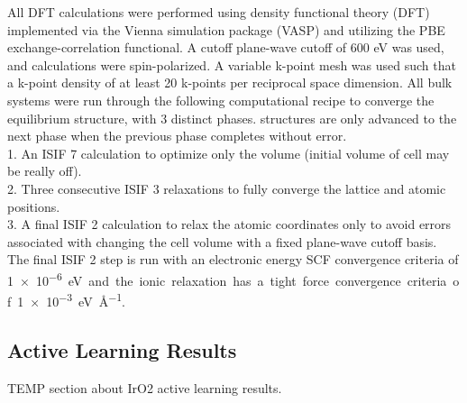 %
%
All DFT calculations were performed using density functional theory (DFT) implemented via the Vienna  simulation package (VASP) \cite{Kresse1995,Kresse1996_0,Kresse1996_1} and utilizing the PBE exchange-correlation functional\cite{Perdew1996}. A cutoff plane-wave cutoff of 600 eV was used, and calculations were spin-polarized. A variable k-point mesh was used such that a k-point density of at least \num{20} k-points per reciprocal space dimension.
%
All bulk systems were run through the following computational recipe to converge the equilibrium structure, with \num{3} distinct phases. structures are only advanced to the next phase when the previous phase completes without error.
\\
1. An ISIF \num{7} calculation to optimize only the volume (initial volume of cell may be really off).
\\
2. Three consecutive ISIF \num{3} relaxations to fully converge the lattice and atomic positions.
\\
3. A final ISIF \num{2} calculation to relax the atomic coordinates only to avoid errors associated with changing the cell volume with a fixed plane-wave cutoff basis.
\\
The final ISIF \num{2} step is run with an electronic energy SCF convergence criteria of \SI{1e-6} eV and the ionic relaxation has a tight force convergence criteria of \SI{1e-3}{\electronvolt\per\angstrom}.




\subsection{\IrOtwo Active Learning Results} %


%
%
TEMP section about IrO2 active learning results.


